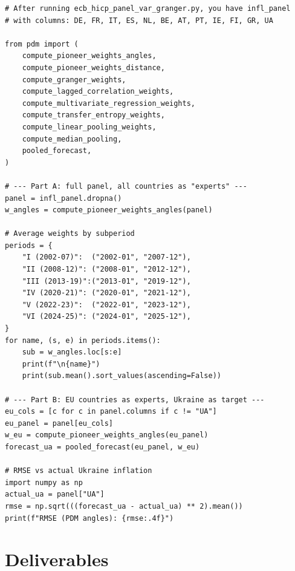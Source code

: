 \documentclass[11pt,a4paper]{article}
\begin{document}
\begin{lstlisting}
# After running ecb_hicp_panel_var_granger.py, you have infl_panel
# with columns: DE, FR, IT, ES, NL, BE, AT, PT, IE, FI, GR, UA

from pdm import (
    compute_pioneer_weights_angles,
    compute_pioneer_weights_distance,
    compute_granger_weights,
    compute_lagged_correlation_weights,
    compute_multivariate_regression_weights,
    compute_transfer_entropy_weights,
    compute_linear_pooling_weights,
    compute_median_pooling,
    pooled_forecast,
)

# --- Part A: full panel, all countries as "experts" ---
panel = infl_panel.dropna()
w_angles = compute_pioneer_weights_angles(panel)

# Average weights by subperiod
periods = {
    "I (2002-07)":  ("2002-01", "2007-12"),
    "II (2008-12)": ("2008-01", "2012-12"),
    "III (2013-19)":("2013-01", "2019-12"),
    "IV (2020-21)": ("2020-01", "2021-12"),
    "V (2022-23)":  ("2022-01", "2023-12"),
    "VI (2024-25)": ("2024-01", "2025-12"),
}
for name, (s, e) in periods.items():
    sub = w_angles.loc[s:e]
    print(f"\n{name}")
    print(sub.mean().sort_values(ascending=False))

# --- Part B: EU countries as experts, Ukraine as target ---
eu_cols = [c for c in panel.columns if c != "UA"]
eu_panel = panel[eu_cols]
w_eu = compute_pioneer_weights_angles(eu_panel)
forecast_ua = pooled_forecast(eu_panel, w_eu)

# RMSE vs actual Ukraine inflation
import numpy as np
actual_ua = panel["UA"]
rmse = np.sqrt(((forecast_ua - actual_ua) ** 2).mean())
print(f"RMSE (PDM angles): {rmse:.4f}")
\end{lstlisting}

\section*{Deliverables}
\end{document}
